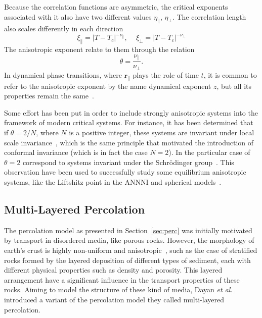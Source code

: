 Because the correlation functions are asymmetric, the critical exponents
associated with it also have two different values $\eta_\parallel$,
$\eta_\perp$. The correlation length also scales differently in each direction
\begin{equation}
    \xi_{\parallel}=
    \left|T-T_{c}\right|^{-\nu_{\parallel}},
    \,\,\,\,\,\,\,
    \xi_{\perp}=\left|T-T_{c}\right|^{-\nu_{\perp}}
\end{equation}
The anisotropic exponent relate to them through the relation
\begin{equation}
    \theta = \frac{\nu_\parallel}{\nu_\perp}.
\end{equation}
In dynamical phase transitions, where $\mathbf{r}_\parallel$ plays the role of
time $t$, it is common to refer to the anisotropic exponent by the name
dynamical exponent $z$, but all its properties remain the
same~\cite{Henkel1994}.

Some effort has been put in order to include strongly anisotropic systems into
the framework of modern critical systems. For instance, it has been determined
that if $\theta=2/N$, where $N$ is a positive integer, these systems are invariant
under local scale invariance~\cite{Henkel2003}, which is the same principle
that motivated the introduction of conformal invariance (which is in fact the
case $N=2$). In the particular case of $\theta=2$ correspond to systems invariant
under the Schr\"odinger group~\cite{Henkel1992}. This observation have been
used to successfully study some equilibrium anisotropic systems, like the
Liftshitz point in the ANNNI and spherical models~\cite{Henkel2010}.


\subsection{Multi-Layered Percolation}
\label{sec:mlp}

The percolation model as presented in Section~\ref{sec:perc} was initially
motivated by transport in disordered media, like porous rocks. However, the
morphology of earth's crust is highly non-uniform and
anisotropic~\cite{Englman1986}, such as the case of stratified rocks formed by
the layered deposition of different types of sediment, each with different
physical properties such as density and porosity. This layered arrangement have
a significant influence in the transport properties of these rocks. Aiming to
model the structure of these kind of media, Dayan \textit{et
al.}~\cite{Dayan1991} introduced a variant of the percolation
model they called multi-layered percolation. 

